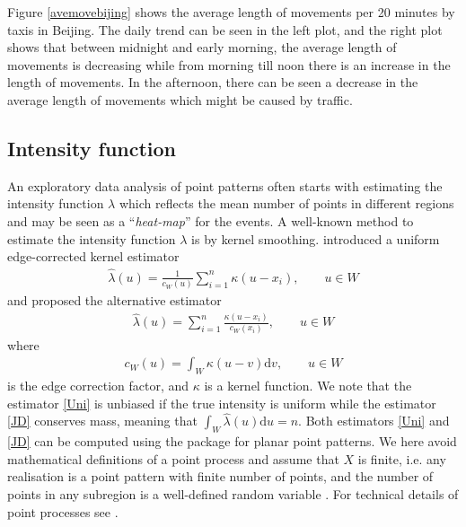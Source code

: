 \documentclass[article]{jss}
\newcommand{\de}{\mathrm{d}}
\begin{document}
Figure \ref{avemovebijing} shows the average length of movements per 20 minutes by taxis in Beijing. The daily trend can be seen in the left plot, and the right plot shows that between midnight and early morning, the average length of movements is decreasing while from morning till noon there is an increase in the length of movements. In the afternoon, there can be seen a decrease in the average length of movements which might be caused by traffic.

\subsection{Intensity function}\label{sec:intensity}
  An exploratory data analysis of point patterns often starts with estimating the intensity function $\lambda$ which reflects the mean number of points in different regions and may be seen as a ``\textit{heat-map}'' for the events. A well-known method to estimate the intensity function $\lambda$ is by kernel smoothing. \cite{D85} introduced a uniform edge-corrected kernel estimator
  \begin{eqnarray}\label{Uni}
  \widehat{\lambda}(u)=\frac{1}{c_W(u)}\sum\limits_{i=1}^{n} \kappa(u-x_i), \qquad u \in W
  \end{eqnarray}
  and \cite{jones93} proposed the alternative estimator
  \begin{eqnarray}\label{JD}
  \widehat{\lambda}(u)=\sum\limits_{i=1}^{n} \frac{\kappa(u-x_i)}{c_W(x_i)}, \qquad u \in W 
  \end{eqnarray}
  where
  \begin{eqnarray}
  c_W(u)=\int_W \kappa(u-v) \de v, \qquad u \in W
  \end{eqnarray}
  is the edge correction factor, and $\kappa$ is a kernel function. We note that the estimator \eqref{Uni} is unbiased if the true intensity is uniform while the estimator \eqref{JD} conserves mass, meaning that $\int_W \hat{\lambda}(u) \de u =n$. Both estimators \eqref{Uni} and \eqref{JD} can be computed using the  package  for planar point patterns. We here avoid mathematical definitions of a point process and assume that $X$ is finite, i.e. any realisation is a point pattern with finite number of points, and the number of points in any subregion is a well-defined random variable \citep{BRT15}. For technical details of point processes see \citep{MW03,daley07}.
  
\end{document}
